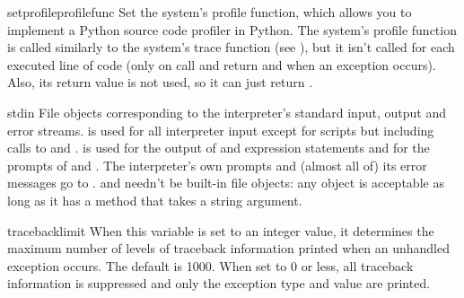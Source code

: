 \begin{funcdesc}{setprofile}{profilefunc}
  Set the system's profile function, which allows you to implement a
  Python source code profiler in Python.  The system's profile function
  is called similarly to the system's trace function (see
  ), but it isn't called for each executed line of
  code (only on call and return and when an exception occurs).  Also,
  its return value is not used, so it can just return .
\end{funcdesc}

\begin{datadesc}{stdin}
  File objects corresponding to the interpreter's standard input,
  output and error streams.   is used for all
  interpreter input except for scripts but including calls to
   and .   is used
  for the output of  and expression statements and for the
  prompts of  and .  The interpreter's
  own prompts and (almost all of) its error messages go to
  .   and  needn't
  be built-in file objects: any object is acceptable as long as it has
  a  method that takes a string argument.
\end{datadesc}

\begin{datadesc}{tracebacklimit}
When this variable is set to an integer value, it determines the
maximum number of levels of traceback information printed when an
unhandled exception occurs.  The default is 1000.  When set to 0 or
less, all traceback information is suppressed and only the exception
type and value are printed.
\end{datadesc}

